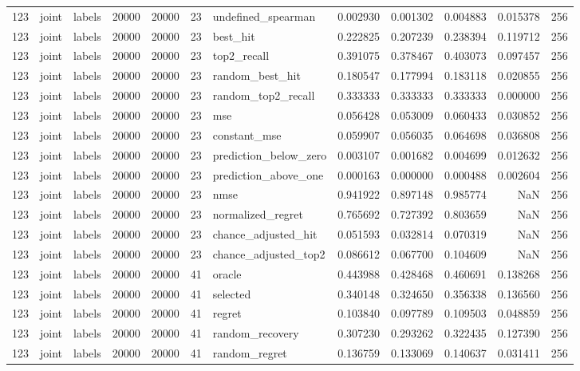 \begin{tabular}{rllrrrlrrrrr}
123 & joint & labels & 20000 & 20000 & 23 & undefined_spearman & 0.002930 & 0.001302 & 0.004883 & 0.015378 & 256 \\
123 & joint & labels & 20000 & 20000 & 23 & best_hit & 0.222825 & 0.207239 & 0.238394 & 0.119712 & 256 \\
123 & joint & labels & 20000 & 20000 & 23 & top2_recall & 0.391075 & 0.378467 & 0.403073 & 0.097457 & 256 \\
123 & joint & labels & 20000 & 20000 & 23 & random_best_hit & 0.180547 & 0.177994 & 0.183118 & 0.020855 & 256 \\
123 & joint & labels & 20000 & 20000 & 23 & random_top2_recall & 0.333333 & 0.333333 & 0.333333 & 0.000000 & 256 \\
123 & joint & labels & 20000 & 20000 & 23 & mse & 0.056428 & 0.053009 & 0.060433 & 0.030852 & 256 \\
123 & joint & labels & 20000 & 20000 & 23 & constant_mse & 0.059907 & 0.056035 & 0.064698 & 0.036808 & 256 \\
123 & joint & labels & 20000 & 20000 & 23 & prediction_below_zero & 0.003107 & 0.001682 & 0.004699 & 0.012632 & 256 \\
123 & joint & labels & 20000 & 20000 & 23 & prediction_above_one & 0.000163 & 0.000000 & 0.000488 & 0.002604 & 256 \\
123 & joint & labels & 20000 & 20000 & 23 & nmse & 0.941922 & 0.897148 & 0.985774 & NaN & 256 \\
123 & joint & labels & 20000 & 20000 & 23 & normalized_regret & 0.765692 & 0.727392 & 0.803659 & NaN & 256 \\
123 & joint & labels & 20000 & 20000 & 23 & chance_adjusted_hit & 0.051593 & 0.032814 & 0.070319 & NaN & 256 \\
123 & joint & labels & 20000 & 20000 & 23 & chance_adjusted_top2 & 0.086612 & 0.067700 & 0.104609 & NaN & 256 \\
123 & joint & labels & 20000 & 20000 & 41 & oracle & 0.443988 & 0.428468 & 0.460691 & 0.138268 & 256 \\
123 & joint & labels & 20000 & 20000 & 41 & selected & 0.340148 & 0.324650 & 0.356338 & 0.136560 & 256 \\
123 & joint & labels & 20000 & 20000 & 41 & regret & 0.103840 & 0.097789 & 0.109503 & 0.048859 & 256 \\
123 & joint & labels & 20000 & 20000 & 41 & random_recovery & 0.307230 & 0.293262 & 0.322435 & 0.127390 & 256 \\
123 & joint & labels & 20000 & 20000 & 41 & random_regret & 0.136759 & 0.133069 & 0.140637 & 0.031411 & 256 \\

\end{tabular}

